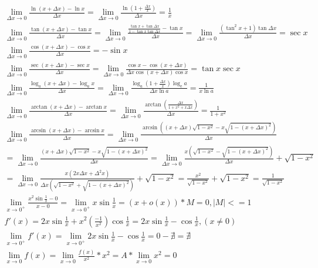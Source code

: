 \documentclass{article}
\begin{document}
\begin{align*}
    \lim_{\Delta x \to 0} \frac{\ln(x+\Delta x)-\ln x}{\Delta x} = \lim_{\Delta x \to 0} \frac{\ln\left(1+\frac{\Delta x}{x}\right)}{\Delta x} = \frac{1}{x} \\
    \lim_{\Delta x \to 0} \frac{\tan(x+\Delta x)-\tan x}{\Delta x} = \lim_{\Delta x \to 0} \frac{\frac{\tan x + \tan \Delta x}{1-\tan x \tan \Delta x}-\tan x}{\Delta x} = \lim_{\Delta x \to 0} \frac{(\tan^2 x+1)\tan \Delta x}{\Delta x} = \sec x \\
    \lim_{\Delta x \to 0} \frac{\cos(x+\Delta x)- \cos x}{\Delta x} = -\sin x \\
    \lim_{\Delta x \to 0} \frac{\sec(x+\Delta x)-\sec x}{\Delta x} = \lim_{\Delta x \to 0} \frac{\cos x-\cos (x+\Delta x)}{\Delta x \cos (x+\Delta x) \cos x} = \tan x \sec x\\ 
    \lim_{\Delta x \to 0} \frac{\log_{a}(x+\Delta x)-\log_{a}x}{\Delta x} = \lim_{\Delta x \to 0} \frac{\log_{a}(1+\frac{\Delta x}{x}) \log_{\mathrm{e}}a}{\Delta x \ln a} = \frac{1}{x\ln a} \\
    \lim_{\Delta x \to 0} \frac{\arctan (x+\Delta x)-\arctan x}{\Delta x} = \lim_{\Delta x \to 0} \frac{\arctan(\frac{\Delta x}{1+x^2+x\Delta x })}{\Delta x} = \frac{1}{1+x^2} \\
    \lim_{\Delta x \to 0} \frac{\arcsin(x+\Delta x)-\arcsin x}{\Delta x} = \lim_{\Delta x \to 0} \frac{\arcsin((x+\Delta x)\sqrt{1-x^2}-x\sqrt{1-(x+\Delta x)^2})}{\Delta x} \\
    = \lim_{\Delta x \to 0} \frac{(x+\Delta x)\sqrt{1-x^2}-x\sqrt{1-(x+\Delta x)^2}}{\Delta x} = \lim_{\Delta x \to 0} \frac{x(\sqrt{1-x^2}-\sqrt{1-(x+\Delta x)^2})}{\Delta x} + \sqrt{1-x^2} \\
    = \lim_{\Delta x \to 0} \frac{x(2x\Delta x+\Delta^2 x)}{\Delta x(\sqrt{1-x^2}+\sqrt{1-(x+\Delta x)^2})} + \sqrt{1-x^2} = \frac{x^2}{\sqrt{1-x^2}} + \sqrt{1-x^2} = \frac{1}{\sqrt{1-x^2}}\\ 
    \lim_{x \to 0^{+}} \frac{x^2\sin \frac{1}{x} -0 }{x - 0} = \lim_{x \to 0^{+}} x\sin \frac{1}{x} = (x + o(x)) * M = 0, |M| <= 1 \\
    f'(x) = 2x \sin \frac{1}{x} + x^2 (\frac{-1}{x^2})\cos \frac{1}{x}=2x\sin \frac{1}{x}-\cos \frac{1}{x} ,(x \neq 0) \\
    \lim_{x \to 0^{+}} f'(x) = \lim_{x \to 0^{+}}2x\sin \frac{1}{x}-\cos \frac{1}{x} = 0 - \nexists = \nexists \\
    \lim_{x \to 0} f(x) = \lim_{x \to 0} \frac{f(x)}{x^2} * x^2 = A * \lim_{x \to 0} x^2 = 0 \\

\end{align*}
\end{document}
